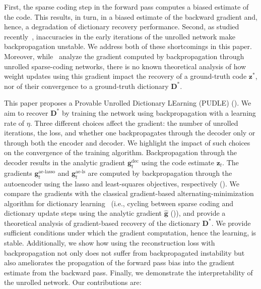 \documentclass[10pt]{article} %
\newcommand{\D}{{\bm D}}
\newcommand{\z}{{\bm z}}
\newcommand{\g}{{\bm g}}
\begin{document}
First, the sparse coding step in the forward pass computes a biased estimate of the code. This results, in turn, in a biased estimate of the backward gradient and, hence, a degradation of dictionary recovery performance. Second, as studied recently~\citep{malezieux2022understanding}, inaccuracies in the early iterations of the unrolled network make backpropagation  unstable. We address both of these shortcomings in this paper. Moreover, while~\citet{malezieux2022understanding} analyze the gradient computed by backpropagation through unrolled sparse-coding networks, there is no known theoretical analysis of how weight updates using this gradient impact the recovery of a ground-truth code $\z^{\ast}$, nor of their convergence to a ground-truth dictionary $\D^{\ast}$.

This paper proposes a Provable Unrolled Dictionary LEarning (PUDLE) (). We aim to recover $\D^{\ast}$ by training the network using backpropagation with a learning rate of $\eta$. Three different choices affect the gradient: the number of unrolled iterations, the loss, and whether one backpropagates through the decoder only or through both the encoder and decoder. We highlight the impact of such choices on the convergence of the training algorithm. Backpropagation through the decoder results in the analytic gradient $\g_t^{\text{dec}}$ using the code estimate $\z_t$. The gradients $\g_t^{\text{ae-lasso}}$ and $\g_t^{\text{ae-ls}}$ are computed by backpropagation through the autoencoder using the lasso and least-squares objectives, respectively (). We compare the gradients with the classical gradient-based alternating-minimization algorithm for dictionary learning~\citep{chatterji2017alternating} (i.e., cycling between sparse coding and dictionary update steps using the analytic gradient $\hat \g$ ()), and provide a theoretical analysis of gradient-based recovery of the dictionary $\D^{\ast}$. We provide sufficient conditions under which the gradient computation, hence the learning, is stable. Additionally, we show how using the reconstruction loss with backpropagation not only does not suffer from backpropagated instability but also ameliorates the propagation of the forward pass bias into the gradient estimate from the backward pass. Finally, we demonstrate the interpretability of the unrolled network. Our contributions are:
%
\end{document}
